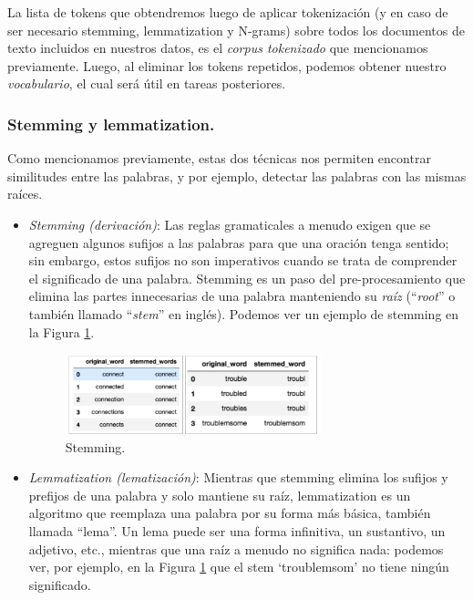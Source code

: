 \documentclass[12pt,a4paper]{article}
\begin{document}
\begin{sloppypar}
La lista de tokens que obtendremos luego de aplicar tokenización (y en caso de ser necesario stemming, lemmatization y N-grams) sobre todos los documentos de texto incluidos en nuestros datos, es el \textit{corpus tokenizado} que mencionamos previamente. Luego, al eliminar los tokens repetidos, podemos obtener nuestro \textit{vocabulario}, el cual será útil en tareas posteriores.

\cleardoublepage

\subsubsection{Stemming y lemmatization.}\label{stem_y_lem}

Como mencionamos previamente, estas dos técnicas nos permiten encontrar similitudes entre las palabras, y por ejemplo, detectar las palabras con las mismas raíces.

\begin{itemize}

\item \textit{Stemming (derivación)}: Las reglas gramaticales a menudo exigen que se agreguen algunos sufijos a las palabras para que una oración tenga sentido; sin embargo, estos sufijos no son imperativos cuando se trata de comprender el significado de una palabra. Stemming es un paso del pre-procesamiento que elimina las partes innecesarias de una palabra manteniendo su \textit{raíz} (“\textit{root}” o también llamado “\textit{stem}” en inglés). Podemos ver un ejemplo de stemming en la Figura \ref{fig:Imagen_NLP_4}.

\begin{figure}[H]    
 \centering
 \includegraphics[width=0.7\textwidth]{images/NLP/4.png}
 \caption{Stemming\cite{NLP_2}.}
 \label{fig:Imagen_NLP_4}
\end{figure}

\item \textit{Lemmatization (lematización)}: Mientras que stemming elimina los sufijos y prefijos de una palabra y solo mantiene su raíz, lemmatization es un algoritmo que reemplaza una palabra por su forma más básica, también llamada “lema”. Un lema puede ser una forma infinitiva, un sustantivo, un adjetivo, etc., mientras que una raíz a menudo no significa nada: podemos ver, por ejemplo, en la Figura \ref{fig:Imagen_NLP_4} que el stem ‘troublemsom’ no tiene ningún significado. 


\end{itemize}
\end{sloppypar}
\end{document}
